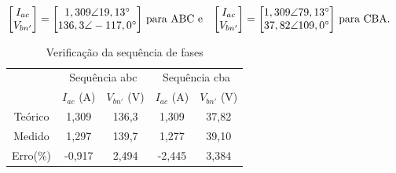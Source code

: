 \documentclass[a4paper,12pt,oneside,openany,table,xcdraw]{article}
\begin{document}
\begin{equation*}
\centering
\begin{aligned}
\mathrm{\begin{bmatrix}
I_{ac}\\
V_{bn'}
\end{bmatrix}} =\mathrm{\begin{bmatrix}
1,309\angle 19,13\mathrm{^{\circ }}\\
136,3\angle -117,0\mathrm{^{\circ }}
\end{bmatrix}} & \text{  para ABC e} & \mathrm{\begin{bmatrix}
I_{ac}\\
V_{bn'}
\end{bmatrix}} =\mathrm{\begin{bmatrix}
1,309\angle 79,13\mathrm{^{\circ }}\\
37,82\angle 109,0\mathrm{^{\circ }}
\end{bmatrix}} & \text{  para CBA.}
\end{aligned}
\end{equation*}

\vspace{0.4cm}
\begin{table}[H]
\centering \small {}
\caption{Verificação da sequência de fases}
\label{m1:dados}
\begin{tabular}{c|c|c|c|c|}
\cline{2-5}
\multicolumn{1}{l|}{} & \multicolumn{2}{c|}{Sequência abc} & \multicolumn{2}{c|}{Sequência cba} \\ \cline{2-5} 
 & $I_{ac}$ (A) & $V_{bn'}$ (V) & $I_{ac}$ (A) & $V_{bn'}$ (V) \\ \hline
\multicolumn{1}{|c|}{Teórico} & 1,309 & 136,3 & 1,309 & 37,82 \\ \hline
\multicolumn{1}{|c|}{Medido} & 1,297 & 139,7 & 1,277 & 39,10 \\ \hline
\multicolumn{1}{|c|}{Erro(\%)} & -0,917 & 2,494 & -2,445 & 3,384 \\ \hline
\end{tabular}
\end{table}
\vspace{0.3cm}
\end{document}
